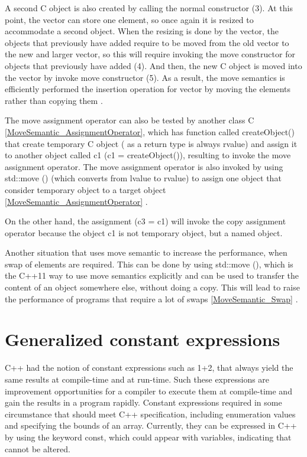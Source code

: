\documentclass[11pt]{report}
\begin{document}
A second C object is also created by calling the normal constructor (3). At this point, the vector can store one element, so once again it is resized to accommodate a second object. When the resizing is done by the vector, the objects that previously have added require to be moved from the old vector to the new and larger vector, so this will require invoking the move constructor for objects that previously have added (4). And then, the new C object is moved into the vector by invoke move constructor (5). As a result, the move semantics is efficiently performed the insertion operation for vector by moving the elements rather than copying them \cite{MSDN:2012:CppModern}.
\newline

The move assignment operator can also be tested by another class C \ref{MoveSemantic_AssignmentOperator}, which has function called createObject() that create temporary C object ( as a return type is always rvalue) and assign it to another object called c1  (c1 = createObject()), resulting to invoke the move assignment operator. The move assignment operator is also invoked by using std::move () (which converts from lvalue to rvalue) to assign one object that consider temporary object to a target object \ref{MoveSemantic_AssignmentOperator} \cite{MSDN:2012:CppModern}.

On the other hand, the assignment (c3 = c1) will invoke the copy assignment operator because the object c1 is not temporary object, but a named object.
\newline

Another situation that uses move semantic to increase the performance, when swap of elements are required. This can be done by using std::move (), which is the C++11 way to use move semantics explicitly and can be used to transfer the content of an object somewhere else, without doing a copy. This will lead to raise the performance of programs that require a lot of swaps \ref{MoveSemantic_Swap} \cite{Gregorie:professionalcpp}.


\section{Generalized constant expressions}
\label{section: Generalized constant expressions}
C++ had the notion of constant expressions such as 1+2, that always yield the same results at compile-time and at run-time. Such these expressions are improvement opportunities for a compiler to execute them at compile-time and gain the results in a program rapidly. Constant expressions required in some circumstance that should meet C++ specification, including enumeration values and specifying the bounds of an array. Currently, they can be expressed in C++ by using the keyword const, which could appear with variables, indicating that cannot be altered.
\newline
\end{document}
